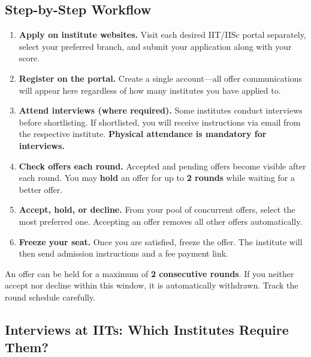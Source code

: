 \subsection{Step-by-Step Workflow}

\begin{enumerate}[label=\textcolor{pfBlue}{\textbf{Step \arabic*.}}, leftmargin=*, itemsep=6pt]
  \item \textbf{Apply on institute websites.}
        Visit each desired IIT/IISc portal separately, select your preferred
        branch, and submit your application along with your \GATE score.

  \item \textbf{Register on the \COAP portal.}
        Create a single \COAP account---all offer communications will appear here
        regardless of how many institutes you have applied to.

  \item \textbf{Attend interviews (where required).}
        Some institutes conduct interviews before shortlisting. If shortlisted,
        you will receive instructions via email from the respective institute.
        \textbf{Physical attendance is mandatory for interviews.}

  \item \textbf{Check offers each round.}
        Accepted and pending offers become visible after each \COAP round.
        You may \textbf{hold} an offer for up to \textbf{2 rounds} while waiting
        for a better offer.

  \item \textbf{Accept, hold, or decline.}
        From your pool of concurrent offers, select the most preferred one.
        Accepting an offer removes all other offers automatically.

  \item \textbf{Freeze your seat.}
        Once you are satisfied, freeze the offer. The institute will then send
        admission instructions and a fee payment link.
\end{enumerate}

\begin{protip}
  An offer can be held for a maximum of \textbf{2 consecutive rounds}. If you
  neither accept nor decline within this window, it is automatically withdrawn.
  Track the round schedule carefully.
\end{protip}

\subsection{Interviews at IITs: Which Institutes Require Them?}

